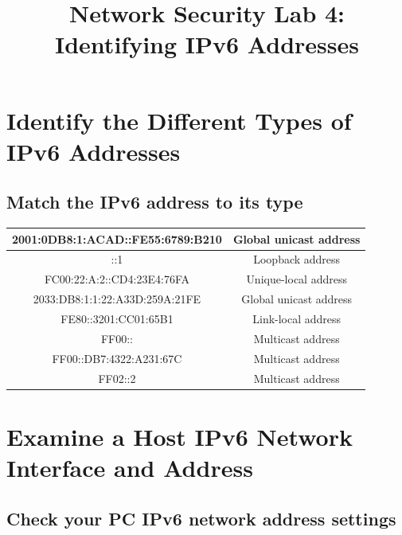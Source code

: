 \documentclass[conference]{IEEEtran}
\begin{document}
\title{Network Security Lab 4: Identifying IPv6 Addresses}

\author{
}

\maketitle

\section{Identify the Different Types of IPv6 Addresses}
\subsection{Match the IPv6 address to its type}

\begin{center}
\begin{tabular}{ |c|c| } 
 \hline
 2001:0DB8:1:ACAD::FE55:6789:B210 & Global unicast address \\ 
 \hline
 ::1 & Loopback address \\ 
 \hline
 FC00:22:A:2::CD4:23E4:76FA & Unique-local address \\ 
 \hline
 2033:DB8:1:1:22:A33D:259A:21FE & Global unicast address \\ 
 \hline
 FE80::3201:CC01:65B1 & Link-local address \\ 
 \hline
 FF00:: & Multicast address \\ 
 \hline
 FF00::DB7:4322:A231:67C & Multicast address \\ 
 \hline
 FF02::2 & Multicast address \\ 
 \hline
\end{tabular}
\end{center}

\section{Examine a Host IPv6 Network Interface and Address}
\subsection{Check your PC IPv6 network address settings}
\end{document}
